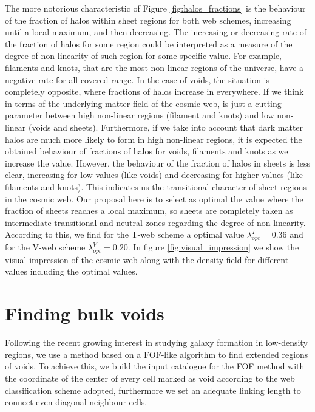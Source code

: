 \documentclass[a4,useAMS,usenatbib,usegraphicx]{latex/mn2e}
\begin{document}
The more notorious characteristic of Figure \ref{fig:halos_fractions} is
the behaviour of the fraction of halos within sheet regions for both web 
schemes, increasing until a local maximum, and then decreasing. The 
increasing or decreasing rate of the fraction of halos for some region 
could be interpreted as a measure of the degree of non-linearity of such 
region for some specific \lth value. For example, filaments and knots, 
that are the most non-linear regions of the universe, have a negative rate 
for all covered \lth range. In the case of voids, the situation is 
completely opposite, where fractions of halos increase in everywhere. If 
we think in terms of the underlying matter field of the cosmic web, \lth 
is just a cutting parameter between high non-linear regions (filament and 
knots) and low non-linear (voids and sheets). Furthermore, if we take into 
account that dark matter halos are much more likely to form in high 
non-linear regions, it is expected the obtained behaviour of fractions of 
halos for voids, filaments and knots as we increase the \lth value. 
However, the behaviour of the fraction of halos in sheets is less clear,
increasing for low \lth values (like voids) and decreasing for higher \lth 
values (like filaments and knots). This indicates us the transitional 
character of sheet regions in the cosmic web. Our proposal here is to 
select as optimal \lth the value where the fraction of sheets reaches a
local maximum, so sheets are completely taken as intermediate transitional 
and neutral zones regarding the degree of non-linearity. According to this,
we find for the T-web scheme a optimal value $\lambda_{opt}^T = 0.36$ and
for the V-web scheme $\lambda_{opt}^V = 0.20$. In figure 
\ref{fig:visual_impression} we show the visual impression of the cosmic 
web along with the density field for different \lth values including the 
optimal values.




\section{Finding bulk voids}
\label{sec:bulk_voids}


Following the recent growing interest in studying galaxy formation in 
low-density regions, we use a method based on a FOF-like algorithm to 
find extended regions of voids. To achieve this, we build the input 
catalogue for the FOF method with the coordinate of the center of every 
cell marked as void according to the web classification scheme adopted, 
furthermore we set an adequate linking length to connect even diagonal 
neighbour cells.
\end{document}
